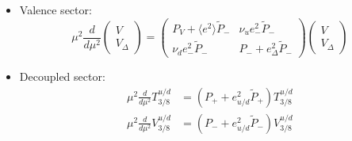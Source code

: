 \documentclass[a4paper,oneside]{article}
\begin{document}
\begin{itemize}
\item Valence sector:
\begin{equation*}
\mu^2\frac{d}{d\mu^2}
\begin{pmatrix}
V \\
V_\Delta
\end{pmatrix}
=
\begin{pmatrix}
P_V+\langle e^2\rangle \tilde{P}_{-} & \nu_ue^2_-\tilde{P}_{-}\\
 \nu_de^2_-\tilde{P}_{-}& P_-+e_\Delta^2 \tilde{P}_{-}
\end{pmatrix}
\begin{pmatrix}
V \\
V_\Delta
\end{pmatrix}
\end{equation*}
\item Decoupled sector:
\begin{align*}
\mu^2\frac{d}{d\mu^2}T^{u/d}_{3/8} & = (P_{+} + e_{u/d}^2 \tilde{P}_{+}) T^{u/d}_{3/8} \\
\mu^2\frac{d}{d\mu^2}V^{u/d}_{3/8} & = (P_{-} + e_{u/d}^2 \tilde{P}_{-} )V^{u/d}_{3/8}
\end{align*}
\end{itemize}
\end{document}
